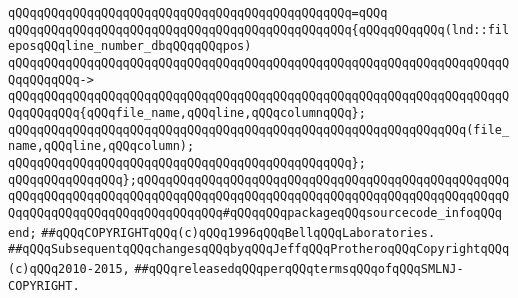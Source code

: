 \verb|qQQqqQQqqQQqqQQqqQQqqQQqqQQqqQQqqQQqqQQqqQQqqQQq=qQQq|\newline
\verb|qQQqqQQqqQQqqQQqqQQqqQQqqQQqqQQqqQQqqQQqqQQqqQQq{qQQqqQQqqQQq(lnd::fileposqQQqline_number_dbqQQqqQQqpos)|\newline
\verb|qQQqqQQqqQQqqQQqqQQqqQQqqQQqqQQqqQQqqQQqqQQqqQQqqQQqqQQqqQQqqQQqqQQqqQQqqQQqqQQq->|\newline
\verb|qQQqqQQqqQQqqQQqqQQqqQQqqQQqqQQqqQQqqQQqqQQqqQQqqQQqqQQqqQQqqQQqqQQqqQQqqQQqqQQq{qQQqfile_name,qQQqline,qQQqcolumnqQQq};|\newline
\newline
\verb|qQQqqQQqqQQqqQQqqQQqqQQqqQQqqQQqqQQqqQQqqQQqqQQqqQQqqQQqqQQqqQQq(file_name,qQQqline,qQQqcolumn);|\newline
\verb|qQQqqQQqqQQqqQQqqQQqqQQqqQQqqQQqqQQqqQQqqQQqqQQq};|\newline
\newline
\verb|qQQqqQQqqQQqqQQq};qQQqqQQqqQQqqQQqqQQqqQQqqQQqqQQqqQQqqQQqqQQqqQQqqQQqqQQqqQQqqQQqqQQqqQQqqQQqqQQqqQQqqQQqqQQqqQQqqQQqqQQqqQQqqQQqqQQqqQQqqQQqqQQqqQQqqQQqqQQqqQQqqQQqqQQq#qQQqqQQqpackageqQQqsourcecode_infoqQQq|\newline
\verb|end;|\newline
\newline
\newline
\verb|##qQQqCOPYRIGHTqQQq(c)qQQq1996qQQqBellqQQqLaboratories.|\newline
\verb|##qQQqSubsequentqQQqchangesqQQqbyqQQqJeffqQQqProtheroqQQqCopyrightqQQq(c)qQQq2010-2015,|\newline
\verb|##qQQqreleasedqQQqperqQQqtermsqQQqofqQQqSMLNJ-COPYRIGHT.|\newline

